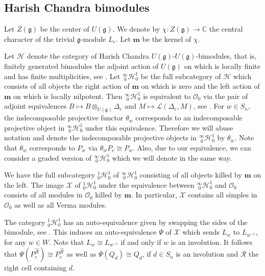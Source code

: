 \documentclass[a4paper]{amsart}
\begin{document}
\subsection{Harish Chandra bimodules}\label{s3.3}

Let $Z(\mathfrak{g})$ be the center of $U(\mathfrak{g})$.
We denote by $\chi:Z(\mathfrak{g})\to\mathbb{C}$ the central
character of the trivial $\mathfrak{g}$-module $L_e$.
Let $\mathbf{m}$ be the kernel of $\chi$.

Let $\mathcal{H}$ denote the category of Harish Chandra
$U(\mathfrak{g})$-$U(\mathfrak{g})$-bimodules, that is,
finitely generated bimodules the adjoint action of 
$U(\mathfrak{g})$ on which is locally finite and has finite
multiplicities, see \cite{Ja}. Let
${}^\infty_{\,\,0} \mathcal{H}_0^1$ be the full subcategory of
$\mathcal{H}$ which consists of all objects the right action 
of $\mathbf{m}$ on which is zero and the left action of 
$\mathbf{m}$ on which is locally nilpotent. Then
${}^\infty_{\,\,0} \mathcal{H}_0^1$ is equivalent to
$\mathcal{O}_0$ via the pair of adjoint equivalences
$B\mapsto B\otimes_{U(\mathfrak{g})}\Delta_e$
and $M\mapsto \mathcal{L}(\Delta_e,M)$, see \cite{BG}.
For $w\in S_n$, the indecomposable projective functor $\theta_w$ 
corresponds to an indecomposable projective object in
${}^\infty_{\,\,0} \mathcal{H}_0^1$ under this equivalence.
Therefore we will abuse notation and denote the 
indecomposable projective objects in
${}^\infty_{\,\,0} \mathcal{H}_0^1$ by $\theta_w$.
Note that $\theta_w$ corresponds to $P_w$ via $\theta_w P_e\cong P_w$.
Also, due to our equivalence, we can consider a graded 
version of ${}^\infty_{\,\,0} \mathcal{H}_0^1$ which we will denote
in the same way.

We have the full subcategory 
${}^1_{0} \mathcal{H}_0^1$ of 
${}^\infty_{\,\,0} \mathcal{H}_0^1$
consisting of all objects killed by $\mathbf{m}$
on the left. The image $\mathcal{X}$
of ${}^1_{0} \mathcal{H}_0^1$ under the
equivalence between ${}^\infty_{\,\,0} \mathcal{H}_0^1$
and $\mathcal{O}_0$
consists of all modules in $\mathcal{O}_0$  killed
by $\mathbf{m}$. In particular, $\mathcal{X}$
contains all simples in $\mathcal{O}_0$ as
well as all Verma modules.

The category ${}^1_{0} \mathcal{H}_0^1$
has an auto-equivalence given by swapping
the sides of the bimodule, see \cite{SoAA}.
This induces an auto-equivalence $\Psi$ of 
$\mathcal{X}$ which sends $L_w$ to $L_{w^{-1}}$,
for any $w\in W$. Note that $L_w\cong L_{w^{-1}}$
if and only if $w$ is an involution. It follows that
$\Psi(P^{\hat{\mathcal{R}}}_e)\cong P^{\hat{\mathcal{R}}}_e$
as well as $\Psi(Q_d)\cong Q_d$, if $d\in S_n$ is an involution
and $\mathcal{R}$ the right cell containing $d$.
\end{document}
